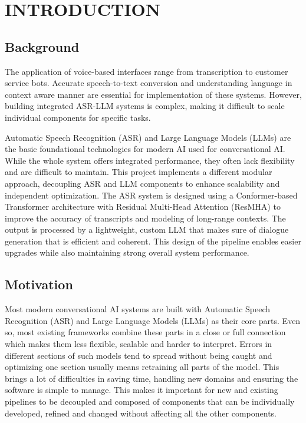 \newpage
\section{\MakeUppercase{Introduction}}

\subsection{Background}
The application of voice-based interfaces range from transcription to customer service bots. Accurate speech-to-text conversion and understanding language in context aware manner are essential for implementation of these systems. However, building integrated ASR-LLM systems is complex, making it difficult to scale individual components for specific tasks.

Automatic Speech Recognition (ASR) and Large Language Models (LLMs) are the basic foundational technologies for modern AI used for conversational AI. While the whole system offers integrated performance, they often lack flexibility and are difficult to maintain. This project implements a different modular approach, decoupling ASR and LLM components to enhance scalability and independent optimization. The ASR system is designed using a Conformer-based Transformer architecture with Residual Multi-Head Attention (ResMHA) to improve the accuracy of transcripts and modeling of long-range contexts. The output is processed by a lightweight, custom LLM that makes sure of dialogue generation that is efficient and coherent. This design of the pipeline enables easier upgrades while also maintaining strong overall system performance.

\subsection{Motivation}
Most modern conversational AI systems are built with Automatic Speech Recognition (ASR) and Large Language Models (LLMs) as their core parts. Even so, most existing frameworks combine these parts in a close or full connection which makes them less flexible, scalable and harder to interpret. Errors in different sections of such models tend to spread without being caught and optimizing one section usually means retraining all parts of the model. This brings a lot of difficulties in saving time, handling new domains and ensuring the software is simple to manage. This makes it important for new and existing pipelines to be decoupled and composed of components that can be individually developed, refined and changed without affecting all the other components.

